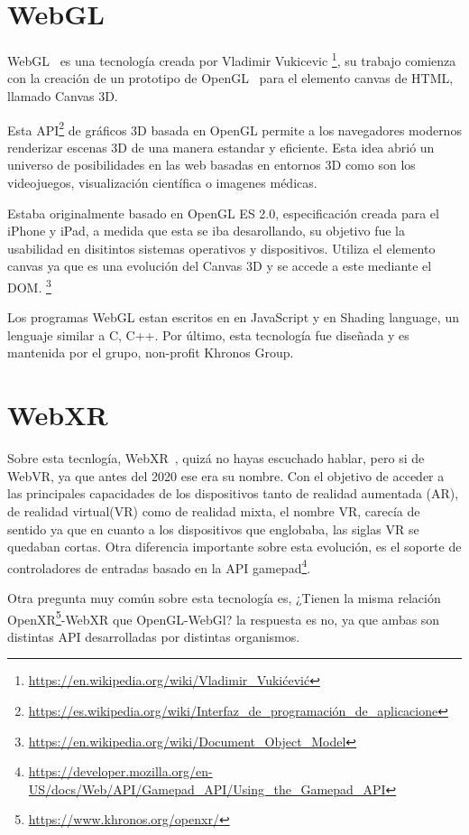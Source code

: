 \documentclass[a4paper, 12pt]{book}
\begin{document}
\section{WebGL} %
\label{sec:WebGl}
WebGL~\cite{webGl} es una tecnología creada por Vladimir Vukicevic \footnote{\url{https://en.wikipedia.org/wiki/Vladimir_Vukićević}}, su trabajo comienza con la creación de un prototipo de OpenGL~\cite{openGL} para el elemento canvas de HTML, llamado Canvas 3D. 

Esta API\footnote{\url{https://es.wikipedia.org/wiki/Interfaz_de_programación_de_aplicacione}} de gráficos 3D basada en OpenGL permite a los navegadores modernos renderizar escenas 3D de una manera estandar y eficiente. Esta idea abrió un universo de posibilidades en las web basadas en entornos 3D como son los videojuegos, visualización científica o imagenes médicas. 

Estaba originalmente basado en OpenGL ES 2.0, especificación creada para el iPhone y iPad, a medida que esta se iba desarollando, su objetivo fue la usabilidad en disitintos sistemas operativos y dispositivos. Utiliza el elemento canvas ya que es una evolución del Canvas 3D y se accede a este mediante el DOM. \footnote{\url{https://en.wikipedia.org/wiki/Document_Object_Model}}

Los programas WebGL estan escritos en en JavaScript y en Shading language, un lenguaje similar a C, C++. Por último, esta tecnología fue diseñada y es mantenida por el grupo, non-profit Khronos Group.

\section{WebXR} %
\label{sec:WebXR}
Sobre esta tecnlogía, WebXR~\cite{webXR}, quizá no hayas escuchado hablar, pero si de WebVR, ya que antes del 2020 ese era su nombre. Con el objetivo de acceder a las principales capacidades de los dispositivos tanto de realidad aumentada (AR), de realidad virtual(VR) como de realidad mixta, el nombre VR, carecía de sentido ya que en cuanto a los dispositivos que englobaba, las siglas VR se quedaban cortas. Otra diferencia importante sobre esta evolución, es el soporte de controladores de entradas basado en la API gamepad\footnote{\url{https://developer.mozilla.org/en-US/docs/Web/API/Gamepad_API/Using_the_Gamepad_API}}.

Otra pregunta muy común sobre esta tecnología es, ¿Tienen la misma relación OpenXR\footnote{\url{https://www.khronos.org/openxr/}}-WebXR que OpenGL-WebGl? la respuesta es no, ya que ambas son distintas API desarrolladas por distintas organismos. 
\end{document}
